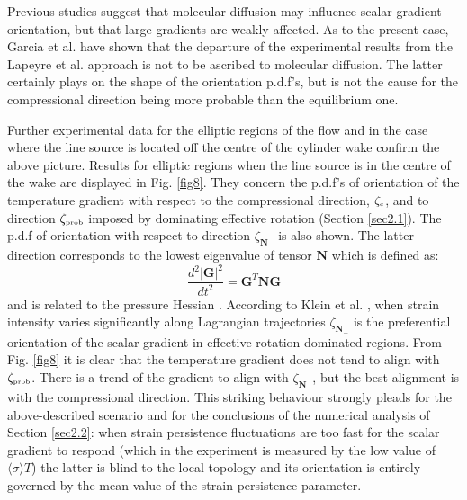 \documentclass[doublespacing]{elsart}
\begin{document}
Previous studies \cite{Lal01,Cal95} suggest that molecular diffusion
may influence scalar gradient orientation, but 
that
large gradients are weakly affected.
As to the present case,
Garcia et al. \cite{Gal05} have shown that the departure of
the experimental results from the Lapeyre et al. approach
is not to be ascribed to molecular diffusion. 
The latter 
certainly 
plays on the shape of the orientation p.d.f's, but
is not the cause for the compressional direction being more
probable than the equilibrium one.


Further
experimental data 
for
the elliptic regions of the flow and in the case where the line
source is located off the centre of the cylinder wake
confirm the above picture. 
Results for elliptic regions when the 
line source is in the centre of the wake are displayed
in Fig. \ref{fig8}.
They concern 
the p.d.f's of orientation of the temperature gradient 
with respect to the compressional direction, 
$ \zeta_{\mbox{\tiny c}} $,
and 
to
direction 
$ \zeta_{\mbox{\tiny prob}} $
imposed by dominating effective rotation
\cite{Lal99} (Section \ref{sec2.1}).
The p.d.f of orientation with respect to direction
$ \zeta_{\bm{N}_-} $ 
is also shown.
The latter direction corresponds to the lowest eigenvalue
of tensor $ \bm{N} $ which is defined as:
\[
\frac{d^2 |\bm{G}|^2}{d t^2}
=
\bm{G}^T \bm{N} \bm{G}
\]
and is related to the pressure Hessian \cite{Kal00}.
According to Klein et al. \cite{Kal00},
when
strain intensity varies significantly along
Lagrangian trajectories
$ \zeta_{\bm{N}_-} $ 
is the preferential orientation of the scalar gradient
in effective-rotation-dominated regions. 
From Fig. \ref{fig8}
it is clear that the temperature gradient does not tend
to align with $ \zeta_{\mbox{\tiny prob}} $.
There is a trend of the gradient to align with
$ \zeta_{\bm{N}_-} $, 
but the best alignment is with the compressional direction.
This striking behaviour 
strongly pleads for the above-described scenario and for the
conclusions of the numerical analysis of Section \ref{sec2.2}:
when strain persistence fluctuations are too fast for the
scalar gradient to respond (which in the experiment is measured
by the low value of $ \langle \sigma \rangle T $)
the latter is blind to the local topology 
and its orientation is entirely governed by the mean value of
the strain persistence parameter.
\end{document}
